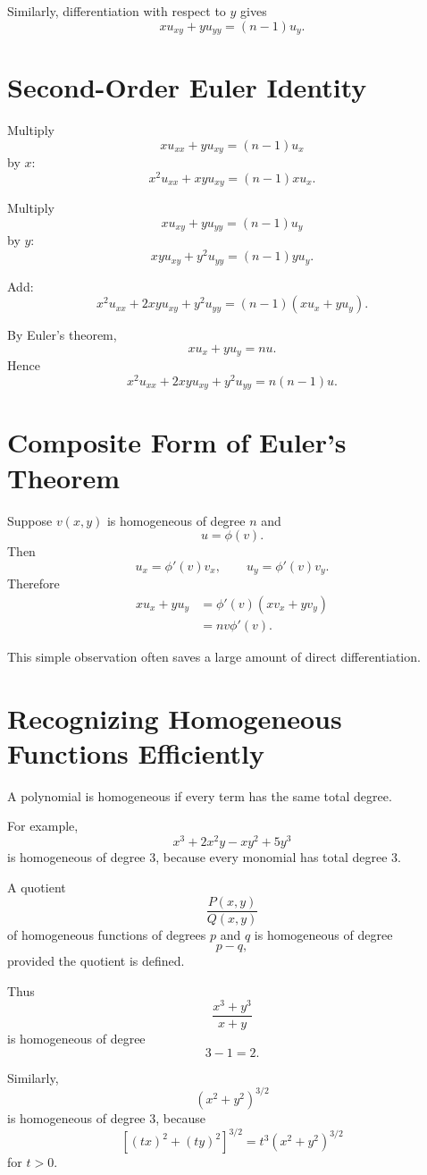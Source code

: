 \documentclass[11pt,oneside]{book}
\theoremstyle{studentthm}
\theoremstyle{definition}
\begin{document}
Similarly, differentiation with respect to \(y\) gives
\[
xu_{xy}+yu_{yy}=(n-1)u_y.
\]

\section{Second-Order Euler Identity}

Multiply
\[
xu_{xx}+yu_{xy}=(n-1)u_x
\]
by \(x\):
\[
x^2u_{xx}+xyu_{xy}=(n-1)xu_x.
\]

Multiply
\[
xu_{xy}+yu_{yy}=(n-1)u_y
\]
by \(y\):
\[
xyu_{xy}+y^2u_{yy}=(n-1)yu_y.
\]

Add:
\[
x^2u_{xx}
+
2xyu_{xy}
+
y^2u_{yy}
=
(n-1)(xu_x+yu_y).
\]

By Euler's theorem,
\[
xu_x+yu_y=nu.
\]
Hence
\[
x^2u_{xx}
+
2xyu_{xy}
+
y^2u_{yy}
=
n(n-1)u.
\]

\section{Composite Form of Euler's Theorem}

Suppose \(v(x,y)\) is homogeneous of degree \(n\) and
\[
u=\phi(v).
\]
Then
\[
u_x=\phi'(v)v_x,
\qquad
u_y=\phi'(v)v_y.
\]
Therefore
\[
\begin{aligned}
xu_x+yu_y
&=
\phi'(v)(xv_x+yv_y)\\
&=
nv\phi'(v).
\end{aligned}
\]

This simple observation often saves a large amount of direct
differentiation.


\section{Recognizing Homogeneous Functions Efficiently}

A polynomial is homogeneous if every term has the same total degree.

For example,
\[
x^3+2x^2y-xy^2+5y^3
\]
is homogeneous of degree \(3\), because every monomial has total degree
\(3\).

A quotient
\[
\frac{P(x,y)}{Q(x,y)}
\]
of homogeneous functions of degrees \(p\) and \(q\) is homogeneous of
degree
\[
p-q,
\]
provided the quotient is defined.

Thus
\[
\frac{x^3+y^3}{x+y}
\]
is homogeneous of degree
\[
3-1=2.
\]

Similarly,
\[
(x^2+y^2)^{3/2}
\]
is homogeneous of degree \(3\), because
\[
[(tx)^2+(ty)^2]^{3/2}
=
t^3(x^2+y^2)^{3/2}
\]
for \(t>0\).
\end{document}
